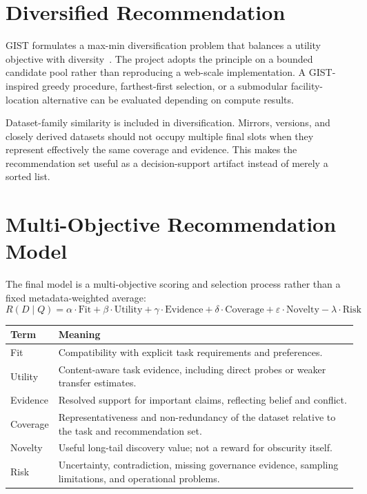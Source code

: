 \documentclass[11pt]{article}
\begin{document}
\section{Diversified Recommendation}
GIST formulates a max-min diversification problem that balances a utility objective with
diversity~\cite{gist,gist-blog}. The project adopts the principle on a bounded candidate pool rather than
reproducing a web-scale implementation. A GIST-inspired greedy procedure, farthest-first selection, or a
submodular facility-location alternative can be evaluated depending on compute results.

Dataset-family similarity is included in diversification. Mirrors, versions, and closely derived datasets
should not occupy multiple final slots when they represent effectively the same coverage and evidence. This
makes the recommendation set useful as a decision-support artifact instead of merely a sorted list.

\section{Multi-Objective Recommendation Model}
\label{sec:ranking-model}
The final model is a multi-objective scoring and selection process rather than a fixed metadata-weighted
average:
\begin{equation}
R(D \mid Q) = \alpha \cdot \mathrm{Fit} + \beta \cdot \mathrm{Utility} + \gamma \cdot \mathrm{Evidence}
  + \delta \cdot \mathrm{Coverage} + \varepsilon \cdot \mathrm{Novelty} - \lambda \cdot \mathrm{Risk}
\end{equation}

\begin{longtable}{@{}L{2.1cm}L{11.4cm}@{}}
\toprule
\textbf{Term} & \textbf{Meaning} \\
\midrule
\endhead
Fit & Compatibility with explicit task requirements and preferences. \\
Utility & Content-aware task evidence, including direct probes or weaker transfer estimates. \\
Evidence & Resolved support for important claims, reflecting belief and conflict. \\
Coverage & Representativeness and non-redundancy of the dataset relative to the task and recommendation
  set. \\
Novelty & Useful long-tail discovery value; not a reward for obscurity itself. \\
Risk & Uncertainty, contradiction, missing governance evidence, sampling limitations, and operational
  problems. \\
\bottomrule
\end{longtable}
\end{document}
